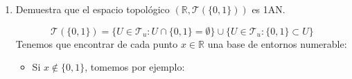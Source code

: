 \documentclass[12pt]{article}
\begin{document}
\begin{ejercicio}[2 puntos]
\begin{enumerate}[label=(\alph*)]
\begin{itemize}[leftmargin=*]
                    
                    $$\overline{[0, 1]} = [0, 1] \cup \mathbb{N}$$
                    
                    En efecto: $[0, 1] \cup \mathbb{N} \in \mathcal{C}_{\mathcal{T}(\mathbb{N})}$ porque su complementario está en $\mathcal{T}_u$ y no corta a $\mathbb{N}$.\\
                    Además, si $x \in \mathbb{N}$ y $U \in \mathcal{T}(\mathbb{N})$ con $x \in U$, entonces $U \notin \mathcal{T}_u \implies \mathbb{N} \subset U$, luego $U$ es entorno de $1$. Esto implica que $x \in \overline{[0, 1]}$.\\
                    En conclusión, $[0, 1] \cup \mathbb{N}$ es el cerrado más pequeño que contiene a $[0, 1]$.
                
                    \item \textbf{Usando argumentos similares a los anteriores, tenemos que:}
                    
                    $$(0, \sqrt{2})^\circ = (0, \sqrt{2}) \setminus \{1\}$$
                    
                    (En efecto, $(0, \sqrt{2}) \setminus \{1\} \in \mathcal{T}(\mathbb{N})$ porque está en $\mathcal{T}_u$ y no corta a $\mathbb{N}$, y $1$ no es interior a $(0, \sqrt{2})$ porque cualquier entorno suyo contiene a $\mathbb{N}$.)
                    
                    $$\overline{(0, \sqrt{2})} = [0, \sqrt{2}] \cup \mathbb{N}$$
                    
                    $$(1, +\infty)^\circ = (1, +\infty) \setminus \mathbb{N}$$
                    
                    $$\overline{(1, +\infty)} = [1, +\infty)$$
                \end{itemize}

            \item Demuestra que el espacio topológico $(\mathbb{R},\mathcal{T}(\{0,1\}))$ es 1AN.

                $$\mathcal{T}(\{0, 1\}) = \{U \in \mathcal{T}_u : U \cap \{0, 1\} = \emptyset\} \cup \{U \in \mathcal{T}_u : \{0, 1\} \subset U\} $$
                Tenemos que encontrar de cada punto $x \in \mathbb{R}$ una base de entornos numerable:
                
                \begin{itemize}[leftmargin=*]
                    \item Si $x \notin \{0, 1\}$, tomemos por ejemplo:
                    

\end{itemize}
\end{enumerate}
\end{ejercicio}
\end{document}
